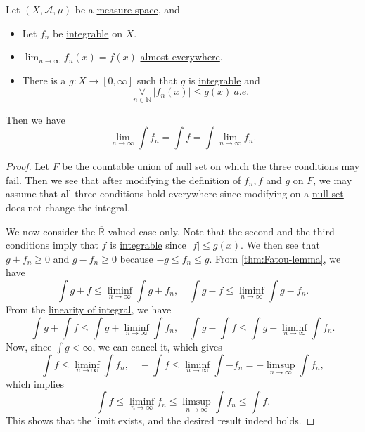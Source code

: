 \begin{theorem}\label{thm:DCT}
	Let \((X, \mathcal{A} , \mu )\) be a \hyperref[def:measure-space]{measure space}, and
	\begin{itemize}
		\item Let \(f_{n}\) be \hyperref[def:integrable]{integrable} on \(X\).
		\item \(\lim_{n \to \infty} f_{n}(x) = f(x)\) \hyperref[def:mu-almost-everywhere]{almost everywhere}.
		\item There is a \(g\colon X\to [0, \infty ]\) such that \(g\) is \hyperref[def:integrable]{integrable} and
		      \[
			      \underset{n\in\mathbb{N} }{\forall }\ \left\vert f_{n}(x) \right\vert \leq g(x)\ \hyperref[def:mu-almost-everywhere]{a.e.}
		      \]
	\end{itemize}
	Then we have
	\[
		\lim_{n \to \infty} \int f_{n} = \int f = \int \lim_{n \to \infty} f_{n}.
	\]
\end{theorem}
\begin{proof}
	Let \(F\) be the countable union of \hyperref[def:mu-null-set]{null set} on which the three conditions may fail. Then we see that after modifying the definition of \(f_{n}, f\) and \(g\) on \(F\),
	we may assume that all three conditions hold everywhere since modifying on a \hyperref[def:mu-null-set]{null set} does not change the integral.

	We now consider the \(\overline{\mathbb{R} }\)-valued case only. Note that the second and the third conditions
	imply that \(f\) is \hyperref[def:integrable]{integrable} since \(\left\vert f \right\vert \leq g(x)\). We then see that \(g + f_{n}\geq 0\) and \(g - f_{n}\geq 0\) because \(-g\leq f_{n}\leq g\).
	From \autoref{thm:Fatou-lemma}, we have
	\[
		\int g + f \leq \liminf_{n \to \infty} \int g + f_{n},\quad \int g - f\leq \liminf_{n \to \infty} \int g - f_{n}.
	\]
	From the \hyperref[lma:linearity-of-integral]{linearity of integral}, we have
	\[
		\int g + \int f\leq \int g + \liminf_{n \to \infty} \int f_{n},\quad \int g - \int f \leq \int g - \liminf_{n \to \infty} \int f_{n}.
	\]
	Now, since \(\int g<\infty \), we can cancel it, which gives
	\[
		\int f \leq \liminf_{n \to \infty} \int f_{n},\quad -\int f \leq \liminf_{n \to \infty} \int -f_{n} = - \limsup_{n \to \infty} \int f_{n},
	\]
	which implies
	\[
		\int f \leq \liminf_{n \to \infty} f_{n}\leq \limsup_{n \to \infty} \int f_{n}\leq \int f.
	\]
	This shows that the limit exists, and the desired result indeed holds.
\end{proof}


